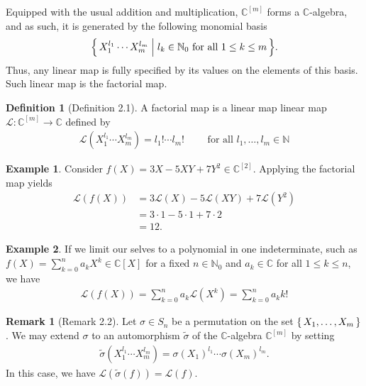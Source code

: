 \documentclass[a4paper]{article}
\theoremstyle{definition}
\newtheorem{definition}{Definition}[]
\newtheorem{example}{Example}[definition]
\newtheorem*{remark}{Remark}
\newcommand{\set}[1]{\mleft\{\, #1 \,\mright\}}
\newcommand{\makeset}[2]{\mleft\{\, #1 \; \middle| \; #2 \,\mright\}}
\begin{document}
Equipped with the usual addition and multiplication, \(\mathbb{C}^{[m]}\) forms a \(\mathbb{C}\)-algebra, and as such, it is generated by the following monomial basis
%
\begin{align*}
    \makeset{X_1^{l_1} \cdots X_m^{l_m}}{l_k \in \mathbb{N}_0 \text{ for all } 1 \leq k \leq m} \text{.}
\end{align*}
%
Thus, any linear map is fully specified by its values on the elements of this basis. Such linear map is the factorial map.
%
\begin{definition}[Definition 2.1]
    A factorial map is a linear map linear map \(\mathcal{L}: \mathbb{C}^{[m]} \longrightarrow \mathbb{C}\) defined by
    \begin{align*}
        \mathcal{L}(X_1^{l_1} \cdots X_m^{l_m}) = l_1! \cdots l_m! \qquad \text{ for all } l_1, \ldots, l_m \in \mathbb{N}
    \end{align*}
\end{definition}
%
\begin{example}
    Consider \(f(X) = 3X - 5XY + 7Y^2 \in \mathbb{C}^{[2]}\). Applying the factorial map yields
    \begin{align*}
        \mathcal{L}(f(X)) &= 3\mathcal{L}(X) - 5 \mathcal{L}(XY) + 7 \mathcal{L}(Y^2) \\
        &= 3 \cdot 1 - 5 \cdot 1 + 7 \cdot 2 \\
        &= 12 \text{.}
    \end{align*}
\end{example}
%
\begin{example}
    If we limit our selves to a polynomial in one indeterminate, such as \(f(X) = \sum_{k = 0}^n a_k X^k \in \mathbb{C}[X]\) for a fixed \(n \in \mathbb{N}_0\) and \(a_k \in \mathbb{C}\) for all \(1 \leq k \leq n\), we have
    \begin{align*}
        \mathcal{L}(f(X)) = \sum_{k = 0}^n a_k \mathcal{L}(X^k) = \sum_{k=0}^n a_k k!
    \end{align*}
\end{example}
%
\begin{remark}[Remark 2.2]
    Let \(\sigma \in S_n\) be a permutation on the set \(\set{X_1, \ldots, X_m}\). We may extend \(\sigma\) to an automorphism \(\tilde{\sigma}\) of the \(\mathbb{C}\)-algebra \(\mathbb{C}^{[m]}\) by setting
    \begin{align*}
        \tilde{\sigma} \left( X_1^{l_1} \cdots X_m^{l_m} \right) = \sigma(X_1)^{l_1} \cdots \sigma(X_m)^{l_m} \text{.}
    \end{align*}
    In this case, we have \(\mathcal{L}(\tilde{\sigma}(f)) = \mathcal{L}(f)\).
\end{remark}
\end{document}
